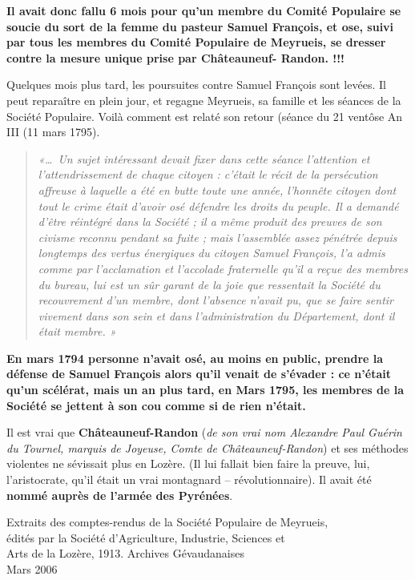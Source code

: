 
\textbf{Il avait donc fallu 6 mois pour qu’un membre du Comité Populaire se soucie du sort de
la femme du pasteur Samuel François, et ose, suivi par tous les membres du Comité
Populaire de Meyrueis, se dresser contre la mesure unique prise par Châteauneuf-
Randon. !!!}

Quelques mois plus tard, les poursuites contre Samuel François sont levées. Il peut reparaître
en plein jour, et regagne Meyrueis, sa famille et les séances de la Société Populaire. Voilà
comment est relaté son retour (séance du 21 ventôse An III (11 mars 1795).

\begin{quote}
\itshape
«\ldots\ Un sujet intéressant devait fixer dans cette séance l’attention et l’attendrissement de
chaque citoyen : c’était le récit de la persécution affreuse à laquelle a été en butte toute une
année, l’honnête citoyen dont tout le crime était d’avoir osé défendre les droits du peuple. Il a
demandé d’être réintégré dans la Société ; il a même produit des preuves de son civisme
reconnu pendant sa fuite ; mais l’assemblée assez pénétrée depuis longtemps des vertus
énergiques du citoyen Samuel François, l’a admis comme par l’acclamation et l’accolade
fraternelle qu’il a reçue des membres du bureau, lui est un sûr garant de la joie que ressentait
la Société du recouvrement d’un membre, dont l’absence n’avait pu, que se faire sentir
vivement dans son sein et dans l’administration du Département, dont il était membre. »
\end{quote}

\textbf{En mars 1794 personne n’avait osé, au moins en public, prendre la défense de Samuel
François alors qu’il venait de s’évader : ce n’était qu’un scélérat, mais un an plus tard,
en Mars 1795, les membres de la Société se jettent à son cou comme si de rien n’était.}

Il est vrai que \textbf{Châteauneuf-Randon} (\textit{de son vrai nom Alexandre Paul Guérin du
Tournel, marquis de Joyeuse, Comte de Châteauneuf-Randon}) et ses méthodes violentes
ne sévissait plus en Lozère. (Il lui fallait bien faire la preuve, lui, l’aristocrate, qu’il était un
vrai montagnard -- révolutionnaire). Il avait été \textbf{nommé auprès de l’armée des Pyrénées}.

\vfill

\begin{center}
\small
Extraits des comptes-rendus de la Société Populaire de Meyrueis,\\
édités par la Société d’Agriculture, Industrie, Sciences et\\
Arts de la Lozère, 1913. Archives Gévaudanaises\\
Mars 2006
\end{center}
